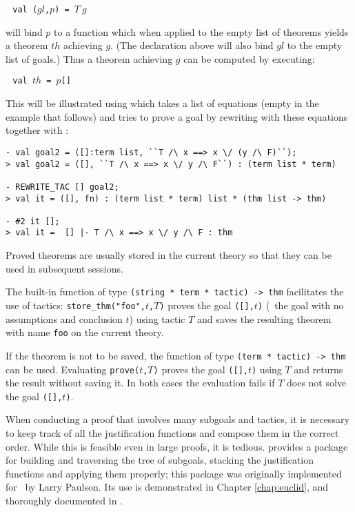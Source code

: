 $\ ${\small\verb| val (|}$gl${\small\verb|,|}$p${\small\verb|) = |}$T\ g$

\noindent will bind $p$ to a function which when applied to the empty list
of theorems yields a theorem $th$ achieving $g$.  (The declaration
above will also bind $gl$ to the empty list of goals.) Thus a theorem
achieving $g$ can be computed by executing:

$\ ${\small\verb| val |}$th${\small\verb| = |}$p${\small\verb|[]|}

\noindent This will be illustrated using  which takes a list
of equations (empty in the example that follows) and tries to prove a goal
by rewriting with these equations together with
:

\begin{session}\begin{verbatim}
- val goal2 = ([]:term list, ``T /\ x ==> x \/ (y /\ F)``);
> val goal2 = ([], ``T /\ x ==> x \/ y /\ F``) : (term list * term)

- REWRITE_TAC [] goal2;
> val it = ([], fn) : (term list * term) list * (thm list -> thm)

- #2 it [];
> val it =  [] |- T /\ x ==> x \/ y /\ F : thm
\end{verbatim}\end{session}

\noindent Proved theorems are usually stored in the current theory
so that they can be used in subsequent sessions.

The built-in function
  of
\ML{} type {\small\verb|(string * term * tactic) -> thm|} facilitates the use
of tactics:
{\small\verb|store_thm("foo",|}$t${\small\verb|,|}$T${\small\verb|)|} proves
the goal   {\small\verb|([],|}$t${\small\verb|)|}   (\ie\  the   goal  with  no
assumptions and  conclusion  $t$)  using  tactic  $T$  and  saves the resulting
theorem with name {\small\verb|foo|} on the current theory.

If the theorem is not to be saved, the function  of type
{\small\verb|(term * tactic) -> thm|} can be used.  Evaluating
{\small\verb|prove(|}$t${\small\verb|,|}$T${\small\verb|)|} proves   the   goal
{\small\verb|([],|}$t${\small\verb|)|} using $T$ and returns the result without
saving it.  In both cases  the evaluation  fails if  $T$ does  not solve the
goal {\small\verb|([],|}$t${\small\verb|)|}.

When conducting a proof that involves many subgoals and tactics, it is
necessary to keep track of all the justification functions and compose
them in the correct order.  While this is feasible even in large
proofs, it is tedious.  \HOL{} provides a package for building and
traversing the tree of subgoals, stacking the justification functions
and applying them properly; this package was originally implemented
for \LCF\ by Larry Paulson. Its use is demonstrated in Chapter
\ref{chap:euclid}, and thoroughly documented in \DESCRIPTION.

